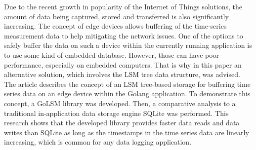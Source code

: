 Due to the recent growth in popularity of the Internet of Things solutions, the amount of data being captured, stored and transferred is also significantly increasing. The concept of edge devices allows buffering of the time-series measurement data to help mitigating the network issues. 
One of the options to safely buffer the data on such a device within the currently running application is to use some kind of embedded database. However, those can have poor performance, especially on embedded computers. That is why in this paper an alternative solution, which involves the LSM tree data structure, was advised.
The article describes the concept of an LSM tree-based storage for buffering time series data on an edge device within the Golang application. To demonstrate this concept, a GoLSM library was developed. Then, a comparative analysis to a traditional in-application data storage engine SQLite was performed. This research shows that the developed library provides faster data reads and data writes than SQLite as long as the timestamps in the time series data are linearly increasing, which is common for any data logging application.